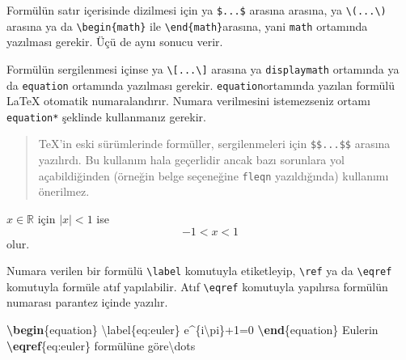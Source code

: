 \documentclass[
  10pt,
]{scrbook}
\newenvironment{Shaded}{\begin{snugshade}}{\end{snugshade}}
\newcommand{\ExtensionTok}[1]{#1}
\newcommand{\FunctionTok}[1]{\textcolor[rgb]{0.00,0.00,0.00}{#1}}
\newcommand{\KeywordTok}[1]{\textcolor[rgb]{0.13,0.29,0.53}{\textbf{#1}}}
\newcommand{\NormalTok}[1]{#1}
\newcommand{\SpecialCharTok}[1]{\textcolor[rgb]{0.00,0.00,0.00}{#1}}
\newcommand{\SpecialStringTok}[1]{\textcolor[rgb]{0.31,0.60,0.02}{#1}}
\theoremstyle{definition}
\theoremstyle{definition}
\theoremstyle{definition}
\theoremstyle{definition}
\theoremstyle{remark}
\begin{document}
Formülün satır içerisinde dizilmesi için ya \texttt{\$...\$} arasına arasına, ya \texttt{\textbackslash{}(...\textbackslash{})} arasına ya da \texttt{\textbackslash{}begin\{math\}} ile \texttt{\textbackslash{}end\{math\}}arasına, yani \texttt{math} ortamında yazılması gerekir. Üçü de aynı sonucu verir.

Formülün sergilenmesi içinse ya \texttt{\textbackslash{}{[}...\textbackslash{}{]}} arasına ya \texttt{displaymath} ortamında ya da \texttt{equation} ortamında yazılması gerekir. \texttt{equation}ortamında yazılan formülü LaTeX otomatik numaralandırır. Numara verilmesini istemezseniz ortamı \texttt{equation*} şeklinde kullanmanız gerekir.

\begin{quote}
TeX'in eski sürümlerinde formüller, sergilenmeleri için \texttt{\$\$...\$\$} arasına yazılırdı. Bu kullanım hala geçerlidir ancak bazı sorunlara yol açabildiğinden (örneğin belge seçeneğine \texttt{fleqn} yazıldığında) kullanımı önerilmez.
\end{quote}

\begin{Shaded}
\end{Shaded}

\(x\in\mathbb{R}\) için \(|x|<1\) ise \begin{equation*}
 -1<x<1
\end{equation*} olur.

Numara verilen bir formülü \texttt{\textbackslash{}label} komutuyla etiketleyip, \texttt{\textbackslash{}ref} ya da \texttt{\textbackslash{}eqref} komutuyla formüle atıf yapılabilir. Atıf \texttt{\textbackslash{}eqref} komutuyla yapılırsa formülün numarası parantez içinde yazılır.

\begin{Shaded}
\begin{Highlighting}[]
\KeywordTok{\textbackslash{}begin}\NormalTok{\{}\ExtensionTok{equation}\NormalTok{\}}
\SpecialCharTok{\textbackslash{}label}\SpecialStringTok{\{eq:euler\}}
\SpecialStringTok{  e\^{}\{i}\SpecialCharTok{\textbackslash{}pi}\SpecialStringTok{\}+1=0}
\KeywordTok{\textbackslash{}end}\NormalTok{\{}\ExtensionTok{equation}\NormalTok{\}}
\NormalTok{Euler\textquotesingle{}in }\KeywordTok{\textbackslash{}eqref}\NormalTok{\{}\ExtensionTok{eq:euler}\NormalTok{\} formülüne göre}\FunctionTok{\textbackslash{}dots}
\end{Highlighting}
\end{Shaded}
\end{document}
